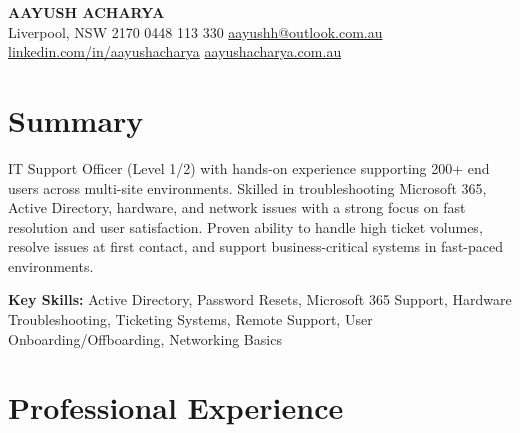 \documentclass[letterpaper,10pt]{article}
\begin{document}
    {\LARGE \textbf{AAYUSH ACHARYA}}\\[2pt]
    Liverpool, NSW 2170 \textbullet{} 0448 113 330 \textbullet{} \href{mailto:aayushh@outlook.com.au}{aayushh@outlook.com.au} \\
    \href{https://linkedin.com/in/aayushacharya}{linkedin.com/in/aayushacharya} \textbullet{} \href{https://aayushacharya.com.au}{aayushacharya.com.au}

\section{Summary}
IT Support Officer (Level 1/2) with hands-on experience supporting 200+ end users across multi-site environments. Skilled in troubleshooting Microsoft 365, Active Directory, hardware, and network issues with a strong focus on fast resolution and user satisfaction. Proven ability to handle high ticket volumes, resolve issues at first contact, and support business-critical systems in fast-paced environments.

\textbf{Key Skills:} Active Directory, Password Resets, Microsoft 365 Support, Hardware Troubleshooting, Ticketing Systems, Remote Support, User Onboarding/Offboarding, Networking Basics

\section{Professional Experience}
\end{document}
